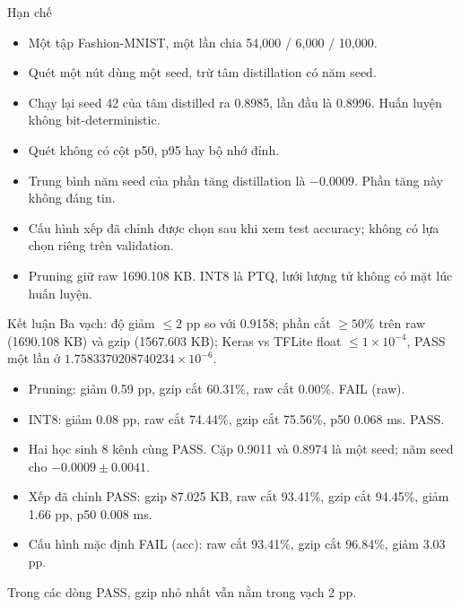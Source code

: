 \documentclass[aspectratio=169,11pt]{beamer}
\begin{document}
\begin{frame}{Hạn chế}
  \begin{itemize}
    \item Một tập Fashion-MNIST, một lần chia 54{,}000 / 6{,}000 / 10{,}000.
    \item Quét một nút dùng một seed, trừ tâm distillation có năm seed.
    \item Chạy lại seed 42 của tâm distilled ra 0.8985, lần đầu là 0.8996.
      Huấn luyện không bit-deterministic.
    \item Quét không có cột p50, p95 hay bộ nhớ đỉnh.
    \item Trung bình năm seed của phần tăng distillation là \(-0.0009\).
      Phần tăng này không đáng tin.
    \item Cấu hình xếp đã chỉnh được chọn sau khi xem test accuracy; không có lựa chọn riêng trên validation.
    \item Pruning giữ raw 1690.108 KB.
      INT8 là PTQ, lưới lượng tử không có mặt lúc huấn luyện.
  \end{itemize}
\end{frame}

\begin{frame}{Kết luận}
  Ba vạch: độ giảm \(\le 2\) pp so với 0.9158; phần cắt \(\ge 50\%\) trên raw (1690.108 KB) và gzip (1567.603 KB); Keras vs TFLite float \(\le 1\times 10^{-4}\), PASS một lần ở \(1.7583370208740234\times 10^{-6}\).
  \vspace{0.3em}
  \begin{itemize}
    \item Pruning: giảm 0.59 pp, gzip cắt 60.31\%, raw cắt 0.00\%. FAIL (raw).
    \item INT8: giảm 0.08 pp, raw cắt 74.44\%, gzip cắt 75.56\%, p50 0.068 ms. PASS.
    \item Hai học sinh 8 kênh cùng PASS. Cặp 0.9011 và 0.8974 là một seed; năm seed cho \(-0.0009 \pm 0.0041\).
    \item Xếp đã chỉnh PASS: gzip 87.025 KB, raw cắt 93.41\%, gzip cắt 94.45\%, giảm 1.66 pp, p50 0.008 ms.
    \item Cấu hình mặc định FAIL (acc): raw cắt 93.41\%, gzip cắt 96.84\%, giảm 3.03 pp.
  \end{itemize}
  \vspace{0.25em}
  Trong các dòng PASS, gzip nhỏ nhất vẫn nằm trong vạch 2 pp.
\end{frame}
\end{document}
